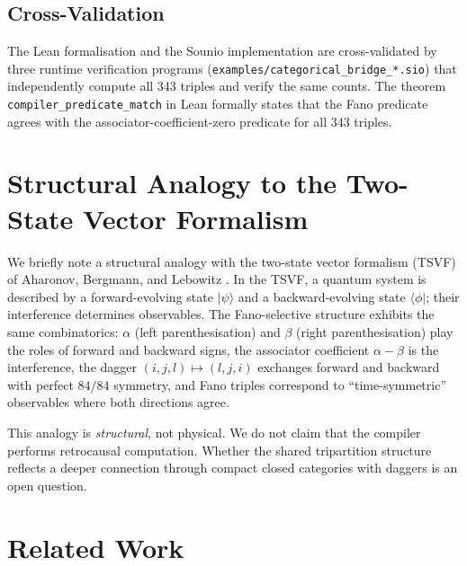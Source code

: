 \documentclass[11pt,a4paper]{article}
\theoremstyle{definition}
\theoremstyle{remark}
\begin{document}
\subsection{Cross-Validation}

The Lean formalisation and the Sounio implementation are
cross-validated by three runtime verification programs
(\texttt{examples/categorical\_bridge\_*.sio}) that independently
compute all 343 triples and verify the same counts. The theorem
\texttt{compiler\_predicate\_match} in Lean formally states that the
Fano predicate agrees with the associator-coefficient-zero predicate for all
343 triples.

\section{Structural Analogy to the Two-State Vector Formalism}
\label{sec:tsvf}

We briefly note a structural analogy with the two-state vector
formalism (TSVF) of Aharonov, Bergmann, and Lebowitz
\cite{abl1964,aharonov2008tsvf}.
In the TSVF, a quantum system is described by a forward-evolving state
$|\psi\rangle$ and a backward-evolving state $\langle\phi|$; their
interference determines observables. The Fano-selective structure
exhibits the same combinatorics: $\alpha$ (left parenthesisation) and
$\beta$ (right parenthesisation) play the roles of forward and backward
signs, the associator coefficient $\alpha - \beta$ is the interference, the
dagger $(i,j,l) \mapsto (l,j,i)$ exchanges forward and backward with
perfect $84/84$ symmetry, and Fano triples correspond to
``time-symmetric'' observables where both directions agree.

This analogy is \emph{structural}, not physical. We do not claim that
the compiler performs retrocausal computation. Whether the shared
tripartition structure reflects a deeper connection through compact
closed categories with daggers \cite{abramsky2004} is an open question.

\section{Related Work}\label{sec:related}
\end{document}

